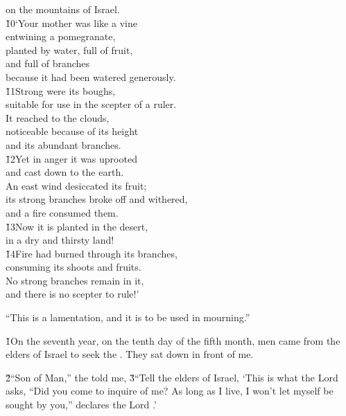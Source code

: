 \begin{poetry}
\poemlll       on the mountains of Israel. \\
\poeml \v{10}`Your mother was like a vine \\
\poemll    entwining a pomegranate, \\
\poeml planted by water, full of fruit, \\
\poemll    and full of branches \\
\poemlll       because it had been watered generously. \\
\poeml \v{11}Strong were its boughs, \\
\poemll    suitable for use in the scepter of a ruler. \\
\poeml It reached to the clouds, \\
\poemll    noticeable because of its height \\
\poemlll       and its abundant branches. \\
\poeml \v{12}Yet in anger it was uprooted \\
\poemll    and cast down to the earth. \\
\poeml An east wind desiccated its fruit; \\
\poemll    its strong branches broke off and withered, \\
\poemlll       and a fire consumed them. \\
\poeml \v{13}Now it is planted in the desert, \\
\poemll    in a dry and thirsty land! \\
\poeml \v{14}Fire had burned through its branches, \\
\poemll    consuming its shoots and fruits. \\
\poeml No strong branches remain in it, \\
\poemll    and there is no scepter to rule!'
\end{poetry}

``This is a lamentation, and it is to be used in mourning.''

\v{1}On the seventh year, on the tenth day of the fifth month, men came from the elders of Israel to seek the . They sat down in front of me.

\v{2}``Son of Man,'' the  told me, \v{3}``Tell the elders of Israel, `This is what the Lord  asks, ``Did you come to inquire of me? As long as I live, I won't let myself be sought by you,'' declares the Lord .'


